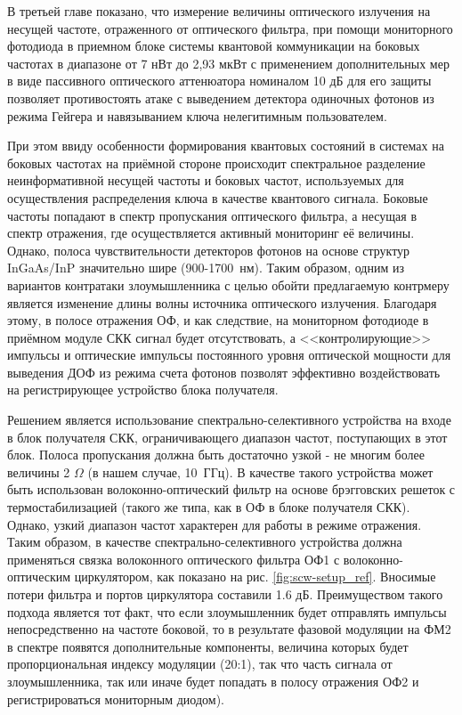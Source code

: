  В третьей главе показано, что измерение величины оптического излучения на несущей частоте, отраженного от оптического фильтра, при помощи мониторного фотодиода в приемном блоке системы квантовой коммуникации на боковых частотах в диапазоне от 7 нВт до 2,93 мкВт с применением дополнительных мер в виде пассивного оптического аттенюатора номиналом 10 дБ для его защиты позволяет противостоять атаке с выведением детектора одиночных фотонов из режима Гейгера и навязыванием ключа нелегитимным пользователем. 
 
 При этом ввиду особенности формирования квантовых состояний в системах на боковых частотах на приёмной стороне происходит спектральное разделение неинформативной несущей частоты и боковых частот, используемых для осуществления распределения ключа в качестве квантового сигнала. Боковые частоты попадают в спектр пропускания оптического фильтра, а несущая в спектр отражения, где осуществляется активный мониторинг её величины. Однако, полоса чувствительности детекторов фотонов на основе структур InGaAs/InP значительно шире (900-1700~нм). Таким образом, одним из вариантов контратаки злоумышленника с целью обойти предлагаемую контрмеру является изменение длины волны источника оптического излучения. Благодаря этому, в полосе отражения ОФ, и как следствие, на мониторном фотодиоде в приёмном модуле СКК сигнал будет отсутствовать, а <<контролирующие>> импульсы и оптические импульсы постоянного уровня оптической мощности для выведения ДОФ из режима счета фотонов позволят эффективно воздействовать на регистрирующее устройство блока получателя.

Решением является использование спектрально-селективного устройства на входе в блок получателя СКК, ограничивающего диапазон частот, поступающих в этот блок. Полоса пропускания должна быть достаточно узкой - не многим более величины 2 $\Omega$ (в нашем случае, 10~ГГц). В качестве такого устройства может быть использован волоконно-оптический фильтр на основе брэгговских решеток с термостабилизацией (такого же типа, как в ОФ в блоке получателя СКК). Однако, узкий диапазон частот характерен для работы в режиме отражения. Таким образом, в качестве спектрально-селективного устройства должна применяться связка волоконного оптического фильтра ОФ1 с волоконно-оптическим циркулятором, как показано на рис. \ref{fig:scw-setup_ref}. Вносимые потери фильтра и портов циркулятора составили 1.6 дБ. Преимуществом такого подхода является тот факт, что если злоумышленник будет отправлять импульсы непосредственно на частоте боковой, то в результате фазовой модуляции на ФМ2 в спектре появятся дополнительные компоненты, величина которых будет пропорциональная индексу модуляции (20:1), так что часть сигнала от злоумышленника, так или иначе будет попадать в полосу отражения ОФ2 и регистрироваться мониторным диодом). 

